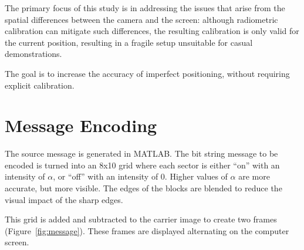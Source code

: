 \documentclass[11pt, letterpaper]{article}
\begin{document}
The primary focus of this study is in addressing the issues that arise from the spatial differences between the camera and the screen: although radiometric calibration can mitigate such differences, the resulting calibration is only valid for the current position, resulting in a fragile setup unsuitable for casual demonstrations.

The goal is to increase the accuracy of imperfect positioning, without requiring explicit calibration.

\section{Message Encoding}
The source message is generated in MATLAB. The bit string message to be encoded is turned into an 8x10 grid where each sector is either ``on'' with an intensity of $\alpha$, or ``off'' with an intensity of $0$.
Higher values of $\alpha$ are more accurate, but more visible.
The edges of the blocks are blended to reduce the visual impact of the sharp edges.

This grid is added and subtracted to the carrier image to create two frames (Figure~\ref{fig:message}). These frames are displayed alternating on the computer screen.
\end{document}
